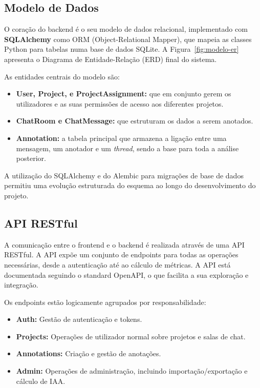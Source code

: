 \subsection{Modelo de Dados}

O coração do backend é o seu modelo de dados relacional, implementado com \textbf{SQLAlchemy} como ORM (Object-Relational Mapper), que mapeia as classes Python para tabelas numa base de dados SQLite. A Figura~\ref{fig:modelo-er} apresenta o Diagrama de Entidade-Relação (ERD) final do sistema.

As entidades centrais do modelo são:
\begin{itemize}
    \item \textbf{User, Project, e ProjectAssignment:} que em conjunto gerem os utilizadores e as suas permissões de acesso aos diferentes projetos.
    \item \textbf{ChatRoom e ChatMessage:} que estruturam os dados a serem anotados.
    \item \textbf{Annotation:} a tabela principal que armazena a ligação entre uma mensagem, um anotador e um \textit{thread}, sendo a base para toda a análise posterior.
\end{itemize}
A utilização do SQLAlchemy e do Alembic para migrações de base de dados permitiu uma evolução estruturada do esquema ao longo do desenvolvimento do projeto.

\subsection{API RESTful}

A comunicação entre o frontend e o backend é realizada através de uma API RESTful. A API expõe um conjunto de endpoints para todas as operações necessárias, desde a autenticação até ao cálculo de métricas. A API está documentada seguindo o standard OpenAPI, o que facilita a sua exploração e integração.

Os endpoints estão logicamente agrupados por responsabilidade:
\begin{itemize}
    \item \textbf{Auth:} Gestão de autenticação e tokens.
    \item \textbf{Projects:} Operações de utilizador normal sobre projetos e salas de chat.
    \item \textbf{Annotations:} Criação e gestão de anotações.
    \item \textbf{Admin:} Operações de administração, incluindo importação/exportação e cálculo de IAA.
\end{itemize}

